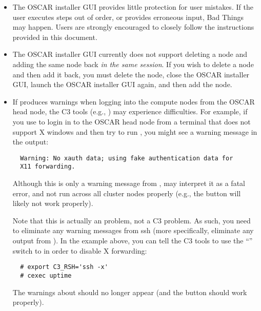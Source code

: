 \begin{itemize}
\item The OSCAR installer GUI provides little protection for user
  mistakes.  If the user executes steps out of order, or provides
  erroneous input, Bad Things may happen.  Users are strongly
  encouraged to closely follow the instructions provided in this
  document.

\item The OSCAR installer GUI currently does not support deleting a
  node and adding the same node back {\em in the same session}.  If
  you wish to delete a node and then add it back, you must delete the
  node, close the OSCAR installer GUI, launch the OSCAR installer GUI
  again, and then add the node.



\item If  produces warnings when logging into the compute
  nodes from the OSCAR head node, the C3 tools (e.g., ) may
  experience difficulties.  For example, if you use  to login
  in to the OSCAR head node from a terminal that does not support X
  windows and then try to run , you might see a warning
  message in the  output:

\begin{verbatim}
  Warning: No xauth data; using fake authentication data for
  X11 forwarding.
\end{verbatim}

  Although this is only a warning message from , 
  may interpret it as a fatal error, and not run across all cluster
  nodes properly (e.g., the  button
  will likely not work properly).

  Note that this is actually an  problem, not a C3 problem.
  As such, you need to eliminate any warning messages from ssh (more
  specifically, eliminate any output from ).  In the
  example above, you can tell the C3 tools to use the ``''
  switch to  in order to disable X forwarding:

\begin{verbatim}
  # export C3_RSH='ssh -x'
  # cexec uptime
\end{verbatim}

  The warnings about  should no longer appear (and the
   button should work properly).


\end{itemize}
